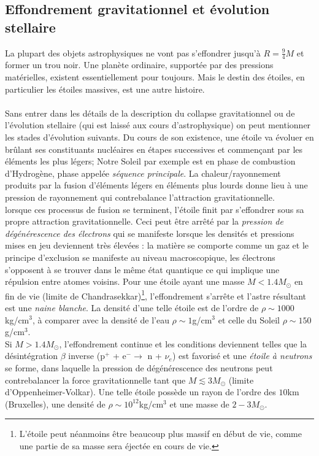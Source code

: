 \subsection{Effondrement gravitationnel et évolution stellaire}
La plupart des objets astrophysiques ne vont pas s'effondrer jusqu'à $R = \frac{9}{4} M$ et former un trou noir. Une planète ordinaire, supportée par des pressions matérielles, existent essentiellement pour toujours. Mais le destin des étoiles, en particulier les étoiles massives, est une autre histoire.\\
\\
Sans entrer dans les détails de la description du collapse gravitationnel ou de l'évolution stellaire (qui est laissé aux cours d'astrophysique) on peut mentionner les stades d'évolution suivants. Du cours de son existence, une étoile va évoluer en brûlant ses constituants nucléaires en étapes successives et commençant par les éléments les plus légers; Notre Soleil par exemple est en phase de combustion d'Hydrogène, phase appelée \emph{séquence principale}. La chaleur/rayonnement produits par la fusion d'éléments légers en éléments plus lourds donne lieu à une pression de rayonnement qui contrebalance l'attraction gravitationnelle. \\
lorsque ces processus de fusion se terminent, l'étoile finit par s'effondrer sous sa propre attraction gravitationnelle. Ceci peut être arrêté par la \emph{pression de dégénérescence des électrons} qui se manifeste lorsque les densités et pressions mises en jeu deviennent très élevées : la matière se comporte comme un gaz et le principe d'exclusion se manifeste au niveau macroscopique, les électrons s'opposent à se trouver dans le même état quantique ce qui implique une répulsion entre atomes voisins. Pour une étoile ayant une masse $M< 1.4 M_\odot$ en fin de vie (limite de Chandrasekkar)\footnote{L'étoile peut néanmoins être beaucoup plus massif en début de vie, comme une partie de sa masse sera éjectée en cours de vie.}, l'effondrement s'arrête et l'astre résultant est une \emph{naine blanche}. La densité d'une telle étoile est de l'ordre de $\rho \sim 1000$kg/cm$^3$, à comparer avec la densité de l'eau $\rho \sim 1$g/cm$^3$ et celle du Soleil $\rho \sim 150$g/cm$^3$.\\
Si $M> 1.4 M_\odot$, l'effondrement continue et les conditions deviennent telles que la désintégration $\beta$ inverse (p$^+$ + e$^- \to$ n + $\nu_e$) est favorisé et une \emph{étoile à neutrons} se forme, dans laquelle la pression de dégénérescence des neutrons peut contrebalancer la force gravitationnelle tant que $M \lesssim 3 M_\odot$ (limite d'Oppenheimer-Volkar). Une telle étoile possède un rayon de l'ordre des $10$km (Bruxelles), une densité de $\rho \sim 10^12$kg/cm$^3$ et une masse de $2-3M_\odot$.
